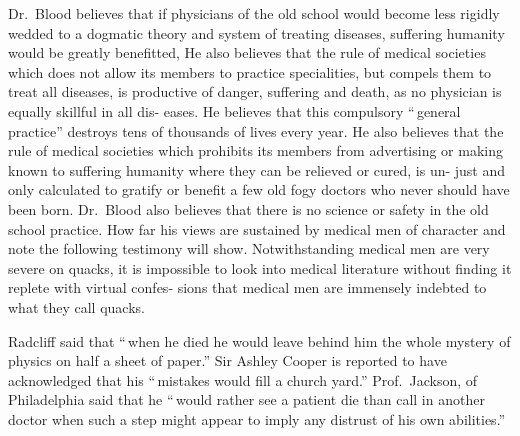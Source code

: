 \documentclass[10pt]{article}
\begin{document}
\begin{multicols}{3}
Dr.~Blood believes that if physicians of the old school would become\linebreak
less rigidly wedded to a dogmatic theory and system of treating diseases,\linebreak
suffering humanity would be greatly benefitted, He also believes that\linebreak
the rule of medical societies which does not allow its members to practice\linebreak
specialities, but compels them to treat all diseases, is productive of\linebreak
danger, suffering and death, as no physician is equally skillful in all dis-\columnbreak\linebreak
eases. He believes that this compulsory ``\,general practice'' destroys\linebreak
tens of thousands of lives every year. He also believes that the rule of\linebreak
medical societies which prohibits its members from advertising or making\linebreak
known to suffering humanity where they can be relieved or cured, is un-\linebreak
just and only calculated to gratify or benefit a few old fogy doctors who\linebreak
never should have been born. Dr.~Blood also believes that there is no\linebreak
science or safety in the old school practice. How far his views are sustained\linebreak
by medical men of character and note the following testimony will show.\linebreak
Notwithstanding medical men are very severe on quacks, it is impossible to\linebreak
look into medical literature without finding it replete with virtual confes-\linebreak
sions that medical men are immensely indebted to what they call quacks.

Radcliff said that ``\,when he died he would leave behind him the\linebreak
whole mystery of physics on half a sheet of paper.'' Sir Ashley Cooper is\linebreak
reported to have acknowledged that his ``\,mistakes would fill a church\linebreak
yard.'' Prof.~Jackson, of Philadelphia said that he ``\,would rather see a\linebreak
patient die than call in another doctor when such a step might appear to\linebreak
imply any distrust of his own abilities.''


\end{multicols}
\end{document}
